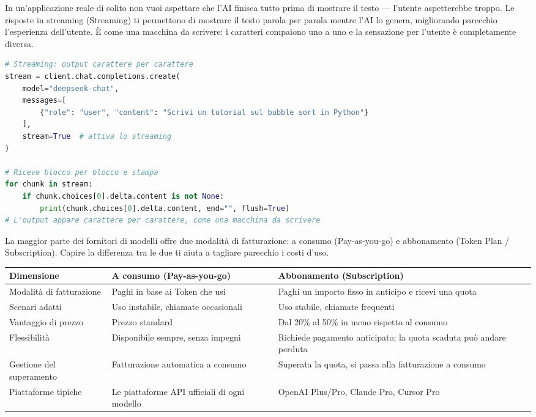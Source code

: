 
In un'applicazione reale di solito non vuoi aspettare che l'AI finisca tutto prima di mostrare il testo — l'utente aspetterebbe troppo. Le risposte in streaming (Streaming) ti permettono di mostrare il testo parola per parola mentre l'AI lo genera, migliorando parecchio l'esperienza dell'utente. È come una macchina da scrivere: i caratteri compaiono uno a uno e la sensazione per l'utente è completamente diversa.

\begin{lstlisting}[language=Python]
# Streaming: output carattere per carattere
stream = client.chat.completions.create(
    model="deepseek-chat",
    messages=[
        {"role": "user", "content": "Scrivi un tutorial sul bubble sort in Python"}
    ],
    stream=True  # attiva lo streaming
)

# Riceve blocco per blocco e stampa
for chunk in stream:
    if chunk.choices[0].delta.content is not None:
        print(chunk.choices[0].delta.content, end="", flush=True)
# L'output appare carattere per carattere, come una macchina da scrivere
\end{lstlisting}


La maggior parte dei fornitori di modelli offre due modalità di fatturazione: a consumo (Pay-as-you-go) e abbonamento (Token Plan / Subscription). Capire la differenza tra le due ti aiuta a tagliare parecchio i costi d'uso.


\begin{center}
\begin{tabularx}{\linewidth}{|X|X|X|}
\hline
\textbf{Dimensione} & \textbf{A consumo (Pay-as-you-go)} & \textbf{Abbonamento (Subscription)} \tabularnewline
\hline
Modalità di fatturazione & Paghi in base ai Token che usi & Paghi un importo fisso in anticipo e ricevi una quota \tabularnewline
Scenari adatti & Uso instabile, chiamate occasionali & Uso stabile, chiamate frequenti \tabularnewline
Vantaggio di prezzo & Prezzo standard & Dal 20\% al 50\% in meno rispetto al consumo \tabularnewline
Flessibilità & Disponibile sempre, senza impegni & Richiede pagamento anticipato; la quota scaduta può andare perduta \tabularnewline
Gestione del superamento & Fatturazione automatica a consumo & Superata la quota, si passa alla fatturazione a consumo \tabularnewline
Piattaforme tipiche & Le piattaforme API ufficiali di ogni modello & OpenAI Plus/Pro, Claude Pro, Cursor Pro \tabularnewline
\hline
\end{tabularx}
\end{center}

